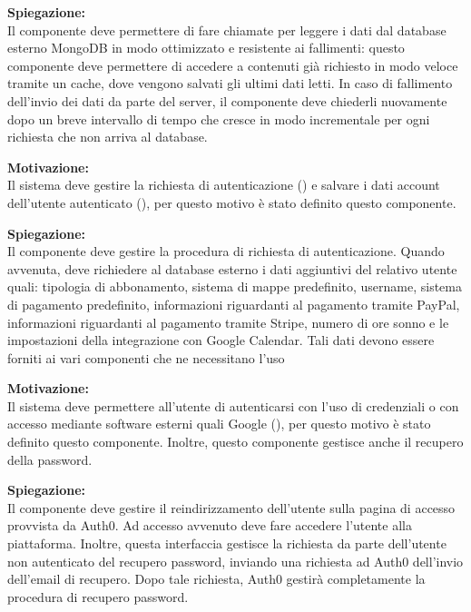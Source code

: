 \begin{listaPersonale}[ACI]{}
    \textbf{Spiegazione:}\\
    Il componente deve permettere di fare chiamate per leggere i dati dal database esterno MongoDB in modo ottimizzato e resistente ai fallimenti: questo componente deve permettere di accedere a contenuti già richiesto in modo veloce tramite un cache, dove vengono salvati gli ultimi dati letti. In caso di fallimento dell'invio dei dati da parte del server, il componente deve chiederli nuovamente dopo un breve intervallo di tempo che cresce in modo incrementale per ogni richiesta che non arriva al database.



    \textbf{Motivazione:}\\
    Il sistema deve gestire la richiesta di autenticazione () e salvare i dati account dell'utente autenticato (), per questo motivo è stato definito questo componente.

    \textbf{Spiegazione:}\\
    Il componente deve gestire la procedura di richiesta di autenticazione. Quando avvenuta, deve richiedere al database esterno i dati aggiuntivi del relativo utente quali: tipologia di abbonamento, sistema di mappe predefinito, username, sistema di pagamento predefinito, informazioni riguardanti al pagamento tramite PayPal, informazioni riguardanti al pagamento tramite Stripe, numero di ore sonno e le impostazioni della integrazione con Google Calendar. Tali dati devono essere forniti ai vari componenti che ne necessitano l'uso



    \textbf{Motivazione:}\\
    Il sistema deve permettere all'utente di autenticarsi con l'uso di credenziali o con accesso mediante software esterni quali Google (), per questo motivo è stato definito questo componente. Inoltre, questo componente gestisce anche il recupero della password.

    \textbf{Spiegazione:}\\
    Il componente deve gestire il reindirizzamento dell'utente sulla pagina di accesso provvista da Auth0. Ad accesso avvenuto deve fare accedere l'utente alla piattaforma. Inoltre, questa interfaccia gestisce la richiesta da parte dell'utente non autenticato del recupero password, inviando una richiesta ad Auth0 dell'invio dell'email di recupero. Dopo tale richiesta, Auth0 gestirà completamente la procedura di recupero password.



\end{listaPersonale}
